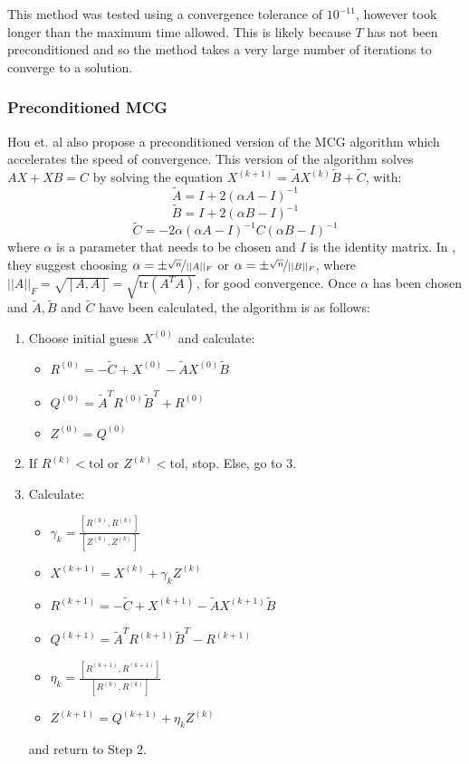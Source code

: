 \documentclass[11pt]{article}
\numberwithin{equation}{section}
\begin{document}
This method was tested using a convergence tolerance of $10^{-11}$, however took longer than the maximum time allowed. This is likely because $T$ has not been preconditioned and so the method takes a very large number of iterations to converge to a solution.

\subsubsection{Preconditioned MCG}
Hou et. al \cite{Hou} also propose a preconditioned version of the MCG algorithm which accelerates the speed of convergence. This version of the algorithm solves $AX + XB = C$ by solving the equation 
$X^{(k+1)} = \widetilde{A}X^{(k)} \widetilde{B} + \widetilde{C}$, with:
\[ \widetilde{A} = I + 2(\alpha A - I)^{-1} \]
\[ \widetilde{B} = I + 2(\alpha B - I)^{-1} \]
\[ \widetilde{C} = -2\alpha(\alpha A - I)^{-1} C (\alpha B - I)^{-1} \]
where $\alpha$ is a parameter that needs to be chosen and $I$ is the identity matrix. In \cite{Hou}, they suggest choosing $\alpha = \pm \nicefrac{\sqrt{n}}{||A||_F}$ or $\alpha = \pm \nicefrac{\sqrt{n}}{||B||_F}$, where $||A||_F = \sqrt{[A,A]} = \sqrt{\text{tr}(A^TA)}$, for good convergence. Once $\alpha$ has been chosen and $\widetilde{A}, \widetilde{B}$ and $\widetilde{C}$ have been calculated, the algorithm is as follows:
\begin{enumerate}
\item Choose initial guess $X^{(0)}$ and calculate:
	\begin{itemize}
	\item $R^{(0)} = -\widetilde{C} + X^{(0)} - \widetilde{A}X^{(0)} \widetilde{B}$
	\item $Q^{(0)} = \widetilde{A}^T R^{(0)}\widetilde{B}^T + R^{(0)}$
	\item $Z^{(0)} = Q^{(0)}$
	\end{itemize}
\item If $R^{(k)} < \text{tol}$ or $Z^{(k)} < \text{tol}$, stop. Else, go to 3.
\item Calculate:
	\begin{itemize}
	\item $ \gamma_k = \frac{[R^{(k)}, R^{(k)}]}{[Z^{(k)}, Z^{(k)}]}$
	\item $X^{(k+1)} = X^{(k)} + \gamma_k Z^{(k)} $
	\item $R^{(k+1)} = -\widetilde{C} + X^{(k+1)} - \widetilde{A}X^{(k+1)} \widetilde{B}$
	\item $Q^{(k+1)} = \widetilde{A}^T R^{(k+1)}\widetilde{B}^T - R^{(k+1)}$
	\item $\eta_k = \frac{[R^{(k+1)}, R^{(k+1)}]}{[R^{(k)}, R^{(k)}]}$ 
	\item $Z^{(k+1)} = Q^{(k+1)} + \eta_k Z^{(k)}$
	\end{itemize}
	and return to Step 2.
\end{enumerate}
\end{document}
